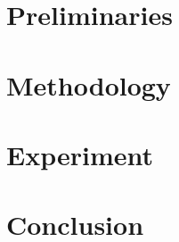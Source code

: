 \documentclass[letterpaper]{article} %
\begin{document}
\section{Preliminaries}
\label{sec:preliminaries}


\section{Methodology}
\label{sec:method}
%
%


\section{Experiment}
\label{sec:experiment}


\section{Conclusion}
\label{sec:conclusion}




\appendix
\setcounter{secnumdepth}{1}
%

\end{document}
